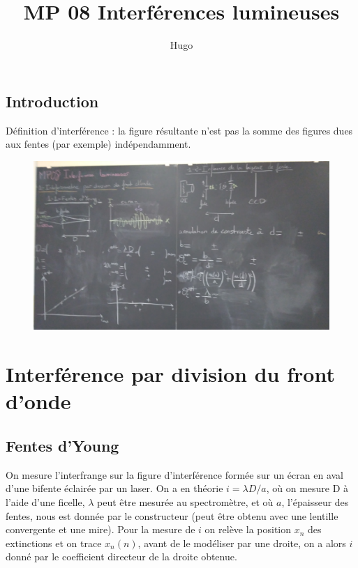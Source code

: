 \documentclass[12pt,prb,aps,epsf]{report}
\begin{document}
	
	\title{MP 08 Interférences lumineuses}
	\author{Hugo}
	
	\maketitle
	
	\tableofcontents
	
	\pagebreak
	
\subsection{Introduction}
Définition d'interférence : la figure résultante n'est pas la somme des figures dues aux fentes (par exemple) indépendamment.

\begin{figure}
	\centerline{\includegraphics[width=14cm]{p1}}
\end{figure}
	
\section{Interférence par division du front d'onde}
\subsection{Fentes d'Young}
On mesure l'interfrange sur la figure d'interférence formée sur un écran en aval d'une bifente éclairée par un laser. On a en théorie $i = \lambda D/a$, où on mesure D à l'aide d'une ficelle, $\lambda$ peut être mesurée au spectromètre, et où $a$, l'épaisseur des fentes, nous est donnée par le constructeur (peut être obtenu avec une lentille convergente et une mire). Pour la mesure de $i$ on relève la position $x_n$ des extinctions et on trace $x_n(n)$, avant de le modéliser par une droite, on a alors $i$ donné par le coefficient directeur de la droite obtenue.
\end{document}
